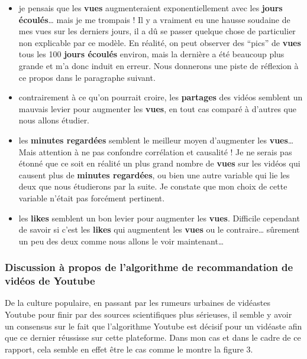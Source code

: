 \begin{itemize}
\tightlist
\item
  je pensais que les \textbf{vues} augmenteraient exponentiellement avec
  les \textbf{jours écoulés}\ldots{} mais je me trompais ! Il y a
  vraiment eu une hausse soudaine de mes vues sur les derniers jours, il
  a dû se passer quelque chose de particulier non explicable par ce
  modèle. En réalité, on peut observer des ``pics'' de \textbf{vues}
  tous les 100 \textbf{jours écoulés} environ, mais la dernière a été
  beaucoup plus grande et m'a donc induit en erreur. Nous donnerons une
  piste de réflexion à ce propos dans le paragraphe suivant.
\item
  contrairement à ce qu'on pourrait croire, les \textbf{partages} des
  vidéos semblent un mauvais levier pour augmenter les \textbf{vues}, en
  tout cas comparé à d'autres que nous allons étudier.
\item
  les \textbf{minutes regardées} semblent le meilleur moyen d'augmenter
  les \textbf{vues}\ldots{} Mais attention à ne pas confondre
  corrélation et causalité ! Je ne serais pas étonné que ce soit en
  réalité un plus grand nombre de \textbf{vues} sur les vidéos qui
  causent plus de \textbf{minutes regardées}, ou bien une autre variable
  qui lie les deux que nous étudierons par la suite. Je constate que mon
  choix de cette variable n'était pas forcément pertinent.
\item
  les \textbf{likes} semblent un bon levier pour augmenter les
  \textbf{vues}. Difficile cependant de savoir si c'est les
  \textbf{likes} qui augmentent les \textbf{vues} ou le
  contraire\ldots{} sûrement un peu des deux comme nous allons le voir
  maintenant\ldots{}
\end{itemize}

\hypertarget{discussion-uxe0-propos-de-lalgorithme-de-recommandation-de-viduxe9os-de-youtube}{%
\subsubsection{Discussion à propos de l'algorithme de recommandation de
vidéos de
Youtube}\label{discussion-uxe0-propos-de-lalgorithme-de-recommandation-de-viduxe9os-de-youtube}}

De la culture populaire, en passant par les rumeurs urbaines de
vidéastes Youtube pour finir par des sources scientifiques plus
sérieuses, il semble y avoir un consensus sur le fait que l'algorithme
Youtube est décisif pour un vidéaste afin que ce dernier réussisse sur
cette plateforme. Dans mon cas et dans le cadre de ce rapport, cela
semble en effet être le cas comme le montre la figure 3.


